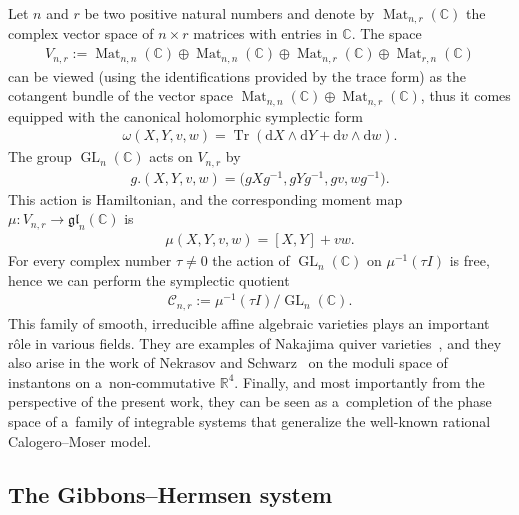 \documentclass[11pt]{article}
\newcommand{\bb}[1]{\mathbb{#1}}
\newcommand{\app}[3]{#1\colon #2\to #3}
\DeclareMathOperator{\tr}{Tr}
\DeclareMathOperator{\GL}{GL}
\DeclareMathOperator{\Mat}{Mat}
\begin{document}
Let \(n\) and \(r\) be two positive natural numbers and denote by \(\Mat_{n,r}(\bb{C})\) the complex vector
space of \(n\times r\) matrices with entries in \(\bb{C}\).
The space
\begin{gather*}
V_{n,r}\mathrel{:=}\Mat_{n,n}(\bb{C})\oplus\Mat_{n,n}(\bb{C})\oplus\Mat_{n,r}(\bb{C})\oplus\Mat_{r,n}(\bb{C})
\end{gather*}
can be viewed (using the identif\/ications provided by the trace form) as the cotangent bundle of the
vector space \(\Mat_{n,n}(\bb{C})\oplus \Mat_{n,r}(\bb{C})\), thus it comes equipped with the canonical
holomorphic symplectic form
\begin{gather}
\omega(X,Y,v,w)=\tr(\mathrm{d}X\wedge\mathrm{d}Y+\mathrm{d}v\wedge\mathrm{d}w).
\label{eq:ss}
\end{gather}
The group \(\GL_{n}(\bb{C})\) acts on \(V_{n,r}\) by
\begin{gather}
\label{eq:az}
g.(X,Y,v,w)=\big(gXg^{-1},gYg^{-1},gv,wg^{-1}\big).
\end{gather}
This action is Hamiltonian, and the corresponding moment map
\(\app{\mu}{V_{n,r}}{\mathfrak{gl}_{n}(\bb{C})}\) is
\begin{gather}
\label{eq:mom-mu}
\mu(X,Y,v,w)=[X,Y]+vw.
\end{gather}
For every complex number \(\tau\neq 0\) the action of \(\GL_{n}(\bb{C})\) on \(\mu^{-1}(\tau I)\) is free,
hence we can perform the symplectic quotient
\begin{gather}
\label{eq:Cnr}
\mathcal{C}_{n,r}\mathrel{:=}\mu^{-1}(\tau I)/\GL_{n}(\bb{C}).
\end{gather}
This family of smooth, irreducible af\/f\/ine algebraic varieties plays an important r\^ole in various
f\/ields.
They are examples of Nakajima quiver varieties~\cite{naka94}, and they also arise in the work of Nekrasov
and Schwarz~\cite{ns98} on the moduli space of instantons on a~non-commutative \(\bb{R}^{4}\).
Finally, and most importantly from the perspective of the present work, they can be seen as a~completion of
the phase space of a~family of integrable systems that generalize the well-known rational Calogero--Moser
model.

\subsection[The Gibbons-Hermsen system]{The Gibbons--Hermsen system}
\end{document}
